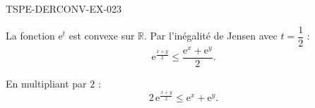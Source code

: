 \begin{corrige}{TSPE-DERCONV-EX-023}

La fonction $\mathrm{e}^t$ est convexe sur $\mathbb{R}$. Par l'inégalité de Jensen avec $t = \dfrac{1}{2}$ :
\[ \mathrm{e}^{\frac{x+y}{2}} \leq \frac{\mathrm{e}^x + \mathrm{e}^y}{2}. \]


En multipliant par $2$ :
\[ 2\,\mathrm{e}^{\frac{x+y}{2}} \leq \mathrm{e}^x + \mathrm{e}^y. \]

\end{corrige}
